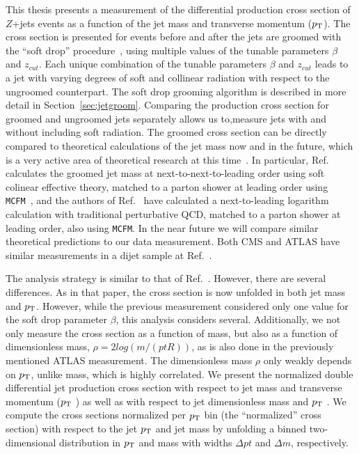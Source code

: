 This thesis presents a measurement of the differential production cross section
of $Z$+jets events as a function of the jet mass and transverse
momentum ($p_{\mathrm{T}}$). The cross section is presented for events before
and after the jets are groomed with the ``soft drop''
procedure~\cite{softdrop}, using multiple values of the tunable parameters $\beta$ and $z_{cut}$. Each unique combination of the tunable parameters $\beta$ and $z_{cut}$ leads to a jet with varying degrees of soft and collinear radiation with respect to the ungroomed counterpart. The soft drop grooming algorithm is described in more detail in Section~\ref{sec:jetgroom}. Comparing the production cross section for groomed and ungroomed jets separately allows us to,measure jets with and without including soft radiation. 
The groomed cross section can be directly compared to theoretical calculations of the jet mass
now and in the future, which is a very active area of theoretical research
at this time~\cite{Dasgupta:2012hg,Chien:2012ur,Jouttenus:2013hs,Almeida:2014uva,Liu:2014oog,Stewart:2014nna,Khelifa-Kerfa:2015mma,Frye:2016aiz,Kolodrubetz:2016dzb}. In particular, Ref.~\cite{Frye:2016aiz} calculates the
groomed jet mass at next-to-next-to-leading order using soft colinear effective theory, matched to a
parton shower at leading order using {\tt MCFM}~\cite{MCFM1,MCFM2}, and the authors of Ref.~\cite{mmdt} have calculated a next-to-leading logarithm calculation with traditional perturbative QCD, matched to a 
parton shower at leading order, also using {\tt MCFM}.  In the near future we will compare similar theoretical predictions to our data measurement. Both CMS and ATLAS have similar measurements in a dijet sample at Ref.~\cite{cms_jetmassDijet, atlas_jetmass2}.

The analysis strategy is similar to that of Ref.~\cite{cms_jetmassDijet}.
However, there are several differences. As in that paper, the cross section is now
unfolded in both jet mass and $p_{\mathrm{T}}$. However, while the previous measurement
considered only one value for the soft drop parameter $\beta$, this analysis considers several.
Additionally, we not only measure the cross section as a function of mass, but also as a function of dimensionless mass, $\rho = 2log(m/(pt R))$, as is also done in the previously mentioned ATLAS measurement.  The dimensionless mass $\rho$ only weakly depends on $p_{\mathrm{T}}$, unlike mass, which is highly correlated.
We present the normalized double differential jet production cross section with respect to jet mass and transverse momentum ($p_{\mathrm{T}}$ ) as well as with respect to jet dimensionless mass and $p_{\mathrm{T}}$ . We compute the cross sections normalized per $p_{\mathrm{T}}$ bin
(the ``normalized'' cross section) with respect to the jet $p_{\mathrm{T}}$ and jet mass 
by unfolding a binned two-dimensional distribution in $p_{\mathrm{T}}$ and mass
with widths $\Delta pt$ and $\Delta m$, respectively.

